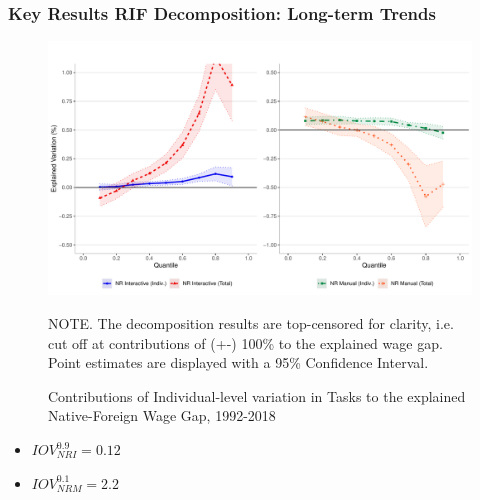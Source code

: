 \documentclass[10pt]{beamer}
\begin{document}
\begin{frame}[label=occ_longterm]
	\frametitle{Key Results RIF Decomposition: Long-term Trends}
	
	
	\begin{figure}[H]
		\begin{minipage}{0.95\textwidth} %
			\centering
			\includegraphics[scale=0.3]{rif_base_nri_nrm} \\
			{\footnotesize \tiny NOTE. \textemdash The decomposition results are top-censored for clarity, i.e. cut off at contributions of (+-) 100\% to the explained wage gap. \\ Point estimates are displayed with a 95\% Confidence Interval. \par}
			\caption{\centering Contributions of Individual-level variation in Tasks to the explained Native-Foreign Wage Gap, 1992-2018 \label{fig:wgap_indiv_occ}}
		\end{minipage}
	\end{figure}
	
\begin{itemize} 
	\item $IOV_{NRI}^{0.9} = 0.12$
	\item $IOV_{NRM}^{0.1} = 2.2$ 
\end{itemize} 

\hyperlink{regression}{}	
	
\end{frame}






\end{document}
